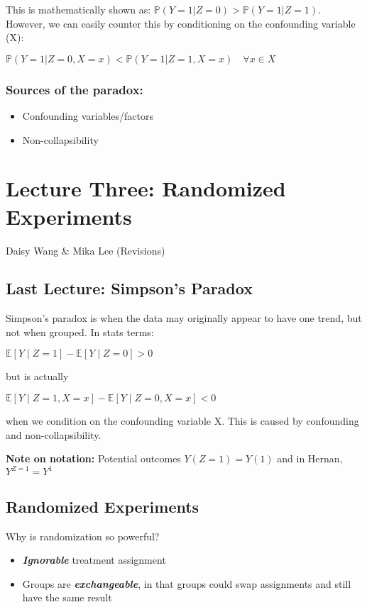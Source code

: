 This is mathematically shown as:
$\mathbb{P}(Y=1|Z=0) > \mathbb{P}(Y=1|Z=1)$. However, we can easily counter this by conditioning on the confounding variable (X):

\begin{center}
    $\mathbb{P}(Y=1|Z=0, X=x) < \mathbb{P}(Y=1|Z=1, X=x) \quad  \forall x \in X $
\end{center}

\subsubsection{Sources of the paradox:}
\begin{itemize}
    \item Confounding variables/factors
    \item Non-collapsibility
\end{itemize}

\section{Lecture Three: Randomized Experiments}{Daisy Wang \& Mika Lee (Revisions)}

\subsection{Last Lecture: Simpson's Paradox}
    Simpson's paradox is when the data may originally appear to have one trend, but not when grouped. In stats terms:
    
\begin{center}
    $\mathbb{E}[Y \mid Z=1] - \mathbb{E}[Y \mid Z=0] > 0$ 
\end{center}
but is actually 
\begin{center}
    $\mathbb{E}[Y \mid Z=1, X=x] - \mathbb{E}[Y \mid Z=0, X=x] <0$ 
\end{center} 
when we condition on the confounding variable X. This is caused by confounding and non-collapsibility.

    \textbf{Note on notation:} Potential outcomes $Y(Z=1) = Y(1)$ and in Hernan, $Y^{Z=1} = Y^1$

\subsection{Randomized Experiments}
    Why is randomization so powerful? 
    \begin{itemize}
        \item\textit{\textbf{Ignorable}} treatment assignment
        \item Groups are \textit{\textbf{exchangeable}}, in that groups could swap assignments and still have the same result
    \end{itemize}

